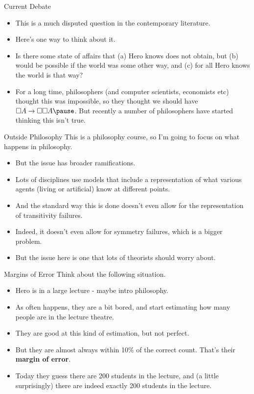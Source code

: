 \documentclass[
  ignorenonframetext,
]{beamer}
\providecommand{\tightlist}{%
  \setlength{\itemsep}{0pt}\setlength{\parskip}{0pt}}
\renewcommand{\,}{\text{, }}
\begin{document}
\begin{frame}{Current Debate}
\protect\hypertarget{current-debate}{}
\begin{itemize}
\tightlist
\item
  This is a much disputed question in the contemporary literature.
\item
  Here's one way to think about it.
\item
  Is there some state of affairs that (a) Hero knows does not obtain,
  but (b) would be possible if the world was some other way, and (c) for
  all Hero knows the world is that way? \pause
\item
  For a long time, philosophers (and computer scientists, economists
  etc) thought this was impossible, so they thought we should have
  \(\Box A \rightarrow \Box \Box A \pause\). But recently a number of
  philosophers have started thinking this isn't true.
\end{itemize}
\end{frame}

\begin{frame}{Outside Philosophy}
\protect\hypertarget{outside-philosophy}{}
This is a philosophy course, so I'm going to focus on what happens in
philosophy.

\begin{itemize}
\tightlist
\item
  But the issue has broader ramifications.
\item
  Lots of disciplines use models that include a representation of what
  various agents (living or artificial) know at different points.
\item
  And the standard way this is done doesn't even allow for the
  representation of transitivity failures.
\item
  Indeed, it doesn't even allow for symmetry failures, which is a bigger
  problem.
\item
  But the issue here is one that lots of theorists should worry about.
\end{itemize}
\end{frame}

\begin{frame}{Margins of Error}
\protect\hypertarget{margins-of-error}{}
Think about the following situation.

\begin{itemize}
\tightlist
\item
  Hero is in a large lecture - maybe intro philosophy.
\item
  As often happens, they are a bit bored, and start estimating how many
  people are in the lecture theatre.
\item
  They are good at this kind of estimation, but not perfect.
\item
  But they are almost always within 10\% of the correct count. That's
  their \textbf{margin of error}.
\item
  Today they guess there are 200 students in the lecture, and (a little
  surprisingly) there are indeed exactly 200 students in the lecture.
\end{itemize}
\end{frame}
\end{document}
